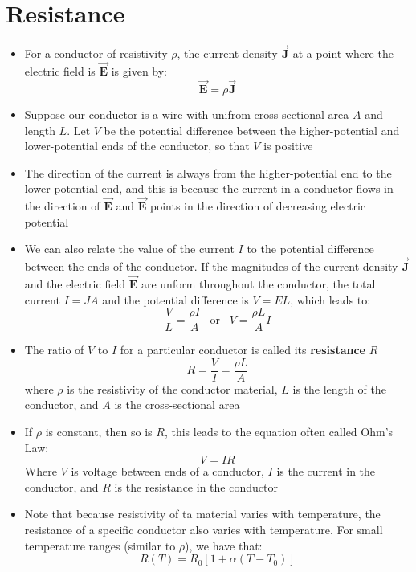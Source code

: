 \documentclass[11pt, a4paper]{article}
\begin{document}
\section[25.3 Resistance]{Resistance}
\begin{itemize}
    \item For a conductor of resistivity $\rho$, the current density $\vec{\mathbf{J}}$
        at a point where the electric field is $\vec{\mathbf{E}}$ is given by:
        \begin{equation}
            \vec{\mathbf{E}} = \rho \vec{\mathbf{J}}
        \end{equation}
    \item Suppose our conductor is a wire with unifrom cross-sectional area $A$ and
        length $L$. Let $V$ be the potential difference between the higher-potential and
        lower-potential ends of the conductor, so that $V$ is positive
    \item The direction of the current is always from the higher-potential end to the
        lower-potential end, and this is because the current in a conductor flows in the
        direction of $\vec{\mathbf{E}}$ and $\vec{\mathbf{E}}$ points in the direction of
        decreasing electric potential
    \item We can also relate the value of the current $I$ to the potential difference
        between the ends of the conductor. If the magnitudes of the current density
        $\vec{\mathbf{J}}$ and the electric field $\vec{\mathbf{E}}$ are unform
        throughout the conductor, the total current $I = JA$ and the potential difference
        is $V = EL$, which leads to:
        \begin{equation}
            \frac{V}{L} = \frac{\rho I}{A} \; \; \; \text{or} \; \; \; V =
            \frac{\rho L}{A} I
        \end{equation}
    \item The ratio of $V$ to $I$ for a particular conductor is called its
        \textbf{resistance} $R$
        \begin{equation}
            R = \frac{V}{I} = \frac{\rho L}{A}
        \end{equation}
        where $\rho$ is the resistivity of the conductor material, $L$ is the length of
        the conductor, and $A$ is the cross-sectional area
    \item If $\rho$ is constant, then so is $R$, this leads to the equation often called
        Ohm's Law:
        \begin{equation}
            V = IR
        \end{equation}
        Where $V$ is voltage between ends of a conductor, $I$ is the current in the
        conductor, and $R$ is the resistance in the conductor
    \item Note that because resistivity of ta material varies with temperature, the
        resistance of a specific conductor also varies with temperature. For small
        temperature ranges (similar to $\rho$), we have that:
        \begin{equation}
            R(T) = R_0 [1 + \alpha(T - T_0)]
        \end{equation}
\end{itemize}
\end{document}
